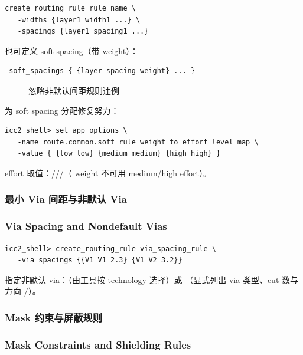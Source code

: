 \begin{lstlisting}
create_routing_rule rule_name \
   -widths {layer1 width1 ...} \
   -spacings {layer1 spacing1 ...}
\end{lstlisting}

也可定义 soft spacing（带 weight）：
\begin{lstlisting}
-soft_spacings { {layer spacing weight} ... }
\end{lstlisting}

\begin{figure}[htbp]
\centering
{}
\caption{忽略非默认间距规则违例}
\label{fig:ignore-ndr-spacing}
\end{figure}

为 soft spacing 分配修复努力：
\begin{lstlisting}
icc2_shell> set_app_options \
   -name route.common.soft_rule_weight_to_effort_level_map \
   -value { {low low} {medium medium} {high high} }
\end{lstlisting}
effort 取值：\cmd{off}/\cmd{low}//（ weight 不可用 medium/high effort）。

\subsubsection{最小 Via 间距与非默认 Via}
\subsubsection*{Via Spacing and Nondefault Vias}

\begin{lstlisting}
icc2_shell> create_routing_rule via_spacing_rule \
   -via_spacings {{V1 V1 2.3} {V1 V2 3.2}}
\end{lstlisting}

指定非默认 via：（由工具按 technology 选择）或 （显式列出 via 类型、cut 数与方向 /）。

\subsubsection{Mask 约束与屏蔽规则}
\subsubsection*{Mask Constraints and Shielding Rules}

